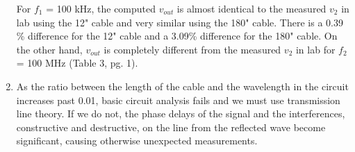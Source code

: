 \documentclass{article}
\begin{document}
\begin{enumerate}
	For $f_1$ = 100 kHz, the computed $v_{out}$ is almost identical to the measured $v_2$ in lab using the 12" cable and very similar using the 180" cable. There is a 0.39 \% difference for the 12" cable and a 3.09\% difference for the 180" cable. On the other hand, $v_{out}$ is completely different from the measured $v_2$ in lab for $f_2$ = 100 MHz (Table 3, pg. 1).
	
	\item As the ratio between the length of the cable and the wavelength in the circuit increases past 0.01, basic circuit analysis fails and we must use transmission line theory. If we do not, the phase delays of the signal and the interferences, constructive and destructive, on the line from the reflected wave become significant, causing otherwise unexpected measurements.
\end{enumerate}
\end{document}
